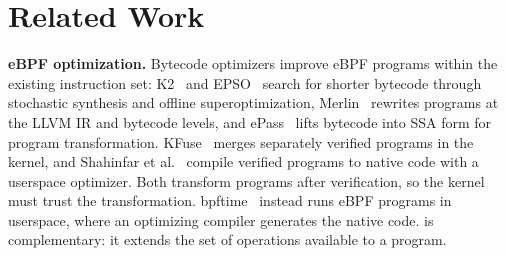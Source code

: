 

\section{Related Work}
\label{sec:related}

\noindent\textbf{eBPF optimization.}
Bytecode optimizers improve eBPF programs within the existing instruction set: K2~\cite{xu2021synthesizing} and EPSO~\cite{zhu2025epso} search for shorter bytecode through stochastic synthesis and offline superoptimization, Merlin~\cite{mao2024merlin} rewrites programs at the LLVM IR and bytecode levels, and ePass~\cite{xiang2025epass} lifts bytecode into SSA form for program transformation.
KFuse~\cite{kfuse} merges separately verified programs in the kernel, and Shahinfar et al.~\cite{shahinfar2026fun} compile verified programs to native code with a userspace optimizer. Both transform programs after verification, so the kernel must trust the transformation.
bpftime~\cite{zheng2025extending} instead runs eBPF programs in userspace, where an optimizing compiler generates the native code.
\tool is complementary: it extends the set of operations available to a program.

